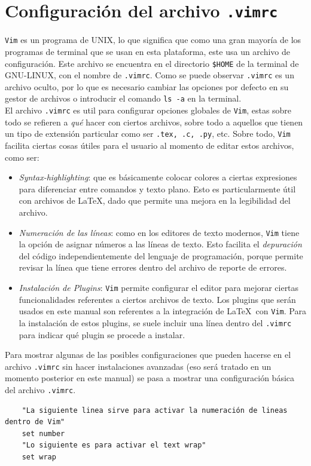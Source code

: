 \documentclass[10pt]{article}
\begin{document}
\section{Configuración del archivo \texttt{.vimrc}}
\texttt{Vim} es un programa de UNIX, lo que significa que como una gran mayoría de los programas de terminal que se usan en esta plataforma, este usa un archivo de configuración. Este archivo se encuentra en el directorio \texttt{\$HOME} de la terminal de GNU-LINUX, con el nombre de \texttt{.vimrc}. 
Como se puede observar \texttt{.vimrc} es un archivo oculto, por lo que es necesario cambiar las opciones por defecto en su gestor de archivos o introducir el comando \texttt{ls -a} en la terminal. \\
El archivo \texttt{.vimrc} es util para configurar opciones globales de \texttt{Vim}, estas sobre todo se refieren a \textit{qué} hacer con ciertos archivos, sobre todo a aquellos que tienen un tipo de extensión particular como ser \texttt{.tex, .c, .py}, etc. Sobre todo, \texttt{Vim} facilita ciertas cosas útiles para el usuario al momento de editar estos archivos, como ser: 
\begin{itemize}
	\item \textit{Syntax-highlighting}:  que es básicamente colocar colores a ciertas expresiones para diferenciar entre comandos y texto plano. Esto es particularmente útil con archivos de \LaTeX, dado que permite una mejora en la legibilidad del archivo.
	\item \textit{Numeración de las líneas}: como en los editores de texto modernos, \texttt{Vim} tiene la opción de asignar números a las líneas de texto. Esto facilita el \textit{depuración} del código independientemente del lenguaje de programación, porque permite revisar la línea que tiene errores dentro del archivo de reporte de errores. 
	\item \textit{Instalación de Plugins}: \texttt{Vim} permite configurar el editor para mejorar ciertas funcionalidades referentes a ciertos archivos de texto. Los plugins que serán usados en este manual son referentes a la integración de \LaTeX \ con \texttt{Vim}. Para la instalación de estos plugins, se suele incluir una línea dentro del \texttt{.vimrc} para indicar qué plugin se procede a instalar.  
\end{itemize}
Para mostrar algunas de las posibles configuraciones que pueden hacerse en el archivo \texttt{.vimrc} sin hacer instalaciones avanzadas (eso será tratado en un momento posterior en este manual) se pasa a mostrar una configuración básica del archivo \texttt{.vimrc}. 
\begin{verbatim}
	"La siguiente linea sirve para activar la numeración de lineas dentro de Vim"
	set number
	"Lo siguiente es para activar el text wrap"
	set wrap
\end{verbatim}
\end{document}
